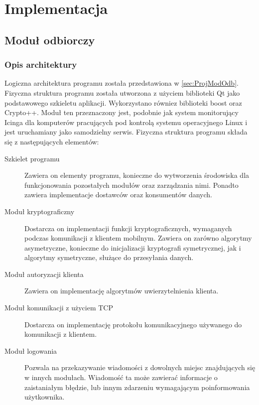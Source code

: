 \chapter{Implementacja}
\label{chap:Implementacja}

\section[Moduł odbiorczy][Moduł odbiorczy]{Moduł odbiorczy}

\subsection[Opis architektury][Opis architektury]{Opis architektury}

Logiczna architektura programu została przedstawiona w
\ref{sec:ProjModOdb}. Fizyczna struktura programu została utworzona z
użyciem biblioteki Qt jako podstawowego szkieletu
aplikacji. Wykorzystano równiez biblioteki boost oraz Crypto++. Moduł
ten przeznaczony jest, podobnie jak system monitorujący Icinga dla
komputerów pracujących pod kontrolą systemu operacyjnego Linux i jest
uruchamiany jako samodzielny serwis. Fizyczna struktura programu
składa się z następujących elementów:

\begin{description}
\item[Szkielet programu] Zawiera on elementy programu, konieczne do
  wytworzenia środowiska dla funkcjonowania pozostałych modułów oraz
  zarządzania nimi. Ponadto zawiera implementacje dostawców oraz
  konsumentów danych.
\item[Moduł kryptograficzny] Dostarcza on implementacji funkcji
  kryptograficznych, wymaganych podczas komunikacji z klientem
  mobilnym. Zawiera on zarówno algorytmy asymetryczne, konieczne do
  inicjalizacji kryptografi symetrycznej, jak i algorytmy symetryczne,
  służące do przesyłania danych.
\item[Moduł autoryzacji klienta] Zawiera on implementację algorytmów
  uwierzytelnienia klienta.
\item[Moduł komunikacji z użyciem TCP] Dostarcza on implementację
  protokołu komunikacyjnego używanego do komunikacji z klientem.
\item[Moduł logowania] Pozwala na przekazywanie wiadomości z dowolnych
  miejsc znajdujących się w innych modułach. Wiadomość ta może
  zawierać informacje o zaistaniałym błędzie, lub innym zdarzeniu
  wymagającym poinformowania użytkownika.
\end{description}

